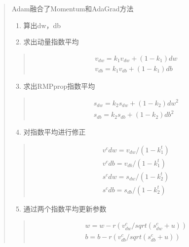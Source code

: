 \documentclass[letterpaper,10pt,english]{sphinxmanual}
\begin{document}
\begin{quote}

Adam融合了Momentum和AdaGrad方法
\begin{enumerate}
\item {} 
算出dw，db

\item {} 
求出动量指数平均

\end{enumerate}
\begin{quote}
\begin{equation*}
\begin{split}v_{dw} = k_1v_{dw}+(1-k_1)dw\\
v_{db} = k_1v_{db}+(1-k_1)db\end{split}
\end{equation*}\end{quote}
\begin{enumerate}
\setcounter{enumi}{2}
\item {} 
求出RMPprop指数平均

\end{enumerate}
\begin{quote}
\begin{equation*}
\begin{split}s_{dw} = k_2s_{dw}+(1-k_2)dw^{2}\\
s_{db} = k_2s_{db}+(1-k_2)db^{2}\end{split}
\end{equation*}\end{quote}
\begin{enumerate}
\setcounter{enumi}{3}
\item {} 
对指数平均进行修正

\end{enumerate}
\begin{quote}
\begin{equation*}
\begin{split}v^{c}dw = v_{dw}/(1-k_1^{t})\\
v^{c}db = v_{db}/(1-k_1^{t})\\
s^{c}dw = s_{dw}/(1-k_2^{t})\\
    s^{c}db = s_{db}/(1-k_2^{t})\end{split}
\end{equation*}\end{quote}
\begin{enumerate}
\setcounter{enumi}{4}
\item {} 
通过两个指数平均更新参数

\end{enumerate}
\begin{quote}
\begin{equation*}
\begin{split}w = w - r(v^{c}_{dw}/sqrt(s^{c}_{dw}+u))\\
b = b - r(v^{c}_{db}/sqrt(s^{c}_{db}+u))\end{split}
\end{equation*}\end{quote}
\end{quote}
\end{document}
